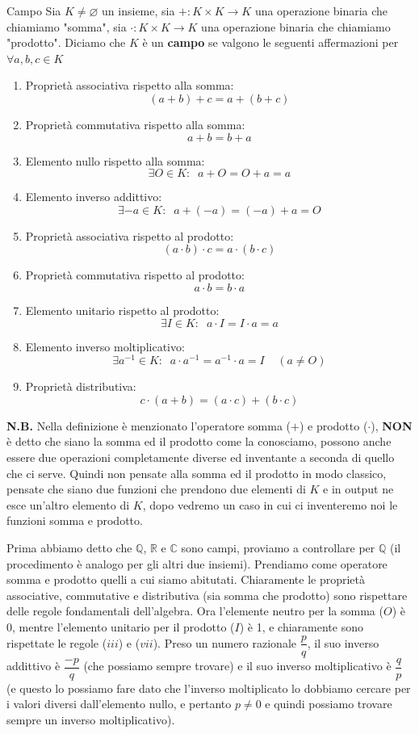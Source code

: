 \documentclass{rapport}
\begin{document}
\begin{definizione}{Campo}{}
  Sia $K \ne \varnothing$ un insieme, sia $+: K \times K \to K$ una operazione binaria che chiamiamo "somma", sia $\cdot: K \times K \to K$ una operazione binaria che chiamiamo "prodotto". Diciamo che $K$ è un \textbf{campo} se valgono le seguenti affermazioni per $\forall a,b,c \in K$
  \begin{enumerate}[label=(\roman*)]
    \item Proprietà associativa rispetto alla somma:
    \[
    (a+b) + c = a+(b+c)
    \]
    \item Proprietà commutativa rispetto alla somma:
    \[
    a+b = b+a
    \]
    \item Elemento nullo rispetto alla somma:
    \[
    \exists O \in K :\;\; a+ O =O + a =a  
    \]
    \item Elemento inverso addittivo:
    \[
    \exists -a \in K :\;\;  a + (-a) = (-a) + a  = O  
    \]
    \item Proprietà associativa rispetto al prodotto:
    \[
    (a\cdot b) \cdot  c = a\cdot (b\cdot c)
    \]
    \item Proprietà commutativa rispetto al prodotto:
    \[
    a\cdot b = b\cdot a
    \]
     \item Elemento unitario rispetto al prodotto:
    \[
    \exists I \in K :\;\; a \cdot I = I \cdot a = a  
    \]
    \item Elemento inverso moltiplicativo:
    \[
    \exists a^{-1} \in K :\;\;  a \cdot a^{-1} = a^{-1} \cdot a  = I \;\;\;\; (a \ne O)  
    \]
    \item Proprietà distributiva:
    \[
    c \cdot (a+b) = (a\cdot c) + (b\cdot c)
    \] 
  \end{enumerate}
\end{definizione}
\textbf{N.B.} Nella definizione è menzionato l'operatore somma ($+$) e prodotto ($\cdot$), \textbf{NON} è detto che siano la somma ed il prodotto come la conosciamo, possono anche essere due operazioni completamente diverse ed inventante a seconda di quello che ci serve. Quindi non pensate alla somma ed il prodotto in modo classico, pensate che siano due funzioni che prendono due elementi di $K$ e in output ne esce un'altro elemento di $K$, dopo vedremo un caso in cui ci inventeremo noi le funzioni somma e prodotto. 

Prima abbiamo detto che $\mathbb{Q}$, $\mathbb{R}$ e $\mathbb{C}$  sono campi, proviamo a controllare per $\mathbb{Q}$ (il procedimento è analogo per gli altri due insiemi). Prendiamo come operatore somma e prodotto quelli a cui siamo abitutati. Chiaramente le proprietà associative, commutative e distributiva (sia somma che prodotto) sono rispettare delle regole fondamentali dell'algebra. Ora l'elemente neutro per la somma ($O$) è 0, mentre l'elemento unitario per il prodotto ($I$) è 1, e chiaramente sono rispettate le regole ($iii$) e ($vii$). Preso un numero razionale $\dfrac{p}{q}$, il suo inverso addittivo è $\dfrac{-p}{q}$ (che possiamo sempre trovare) e il suo inverso moltiplicativo è $\dfrac{q}{p}$ (e questo lo possiamo fare dato che l'inverso moltiplicato lo dobbiamo cercare per i valori diversi dall'elemento nullo, e pertanto $p\ne 0$ e quindi possiamo trovare sempre un inverso moltiplicativo). 
\end{document}
